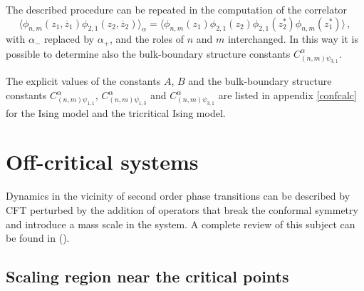 \documentclass[a4paper,12pt]{report}
\begin{document}
\vspace{0.5cm}

The described procedure can be repeated in the computation of the correlator
\begin{equation}
\langle \phi _{n,m}\left(z_{1},\overline{z}_{1} \right)\phi _{2,1}\left(z_{2},\overline{z}_{2} \right)\rangle
_{\alpha}= \langle \phi _{n,m}\left(z_{1} \right)\phi _{2,1}\left(z_{2} \right)\phi _{2,1}\left(z^{*}_{2}
\right)\phi _{n,m}\left(z^{*}_{1} \right)\rangle \,,
\end{equation}
with $\alpha _{-}$ replaced by $ \alpha _{+}$, and the roles of $n$ and $m$ interchanged. In this way it is
possible to determine also the bulk-boundary structure constants $C_{(n,m)\psi _{3,1}}^{\alpha}$.

\vspace{0.5cm}

The explicit values of the constants $A$, $B$ and the bulk-boundary structure constants $C_{(n,m)\psi
_{1,1}}^{\alpha}$, $C_{(n,m)\psi _{1,3}}^{\alpha}$ and $C_{(n,m)\psi _{3,1}}^{\alpha}$ are listed in appendix
\ref{confcalc} for the Ising model and the tricritical Ising model.





\newpage

\chapter{Off-critical systems}

Dynamics in the vicinity of second order phase transitions can be described by CFT perturbed by the addition of
operators that break the conformal symmetry and introduce a mass scale in the system. A complete review of this
subject can be found in (\cite{mussrev}).

\vspace{1cm}

\section{Scaling region near the critical points}
\end{document}
